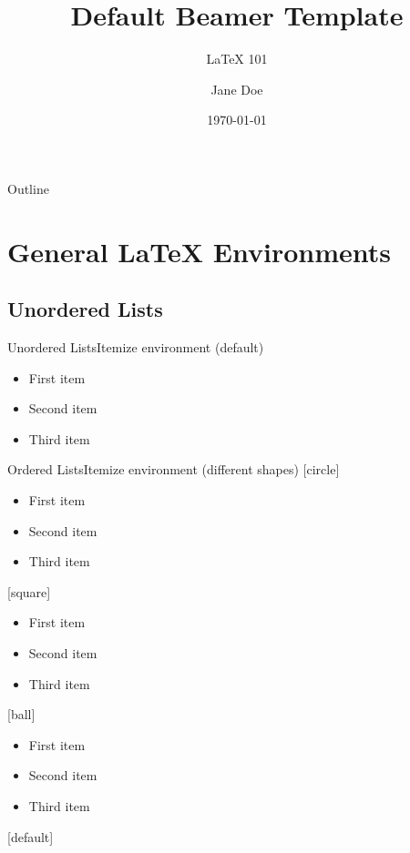 \documentclass{beamer}
\title {Default Beamer Template}
\subtitle{\LaTeX{} 101}
\author{Jane Doe}
\institute{UC Davis GradPathways}
\date{\today}
\begin{document}
    \begin{frame}
    	\titlepage
    \end{frame}

    \label{Outline}
    \begin{frame}{Outline}
    	\tableofcontents
    \end{frame}

    \section{General \LaTeX{} Environments}

    \subsection{Unordered Lists}

    \begin{frame}{Unordered Lists}{Itemize environment (default)}
    \begin{itemize}
        \item First item
        \item Second item
        \item Third item
    \end{itemize}
    \end{frame}

    \begin{frame}{Ordered Lists}{Itemize environment (different shapes)}
    [circle]
    \begin{itemize}
        \item First item
        \item Second item
        \item Third item
    \end{itemize}

    [square]
    \begin{itemize}
        \item First item
        \item Second item
        \item Third item
    \end{itemize}

    [ball]
    \begin{itemize}
        \item First item
        \item Second item
        \item Third item
    \end{itemize}

    [default] %

    \end{frame}
\end{document}
